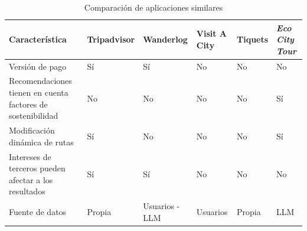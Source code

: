 \begin{table}[h]
	\centering
	\renewcommand{\arraystretch}{1.5} %
	\begin{tabular}{m{4.5cm} >{\centering\arraybackslash}m{2cm} >{\centering\arraybackslash}m{2cm} >{\centering\arraybackslash}m{2cm} >{\centering\arraybackslash}m{2cm} >{\centering\arraybackslash}m{2.5cm}} %
	\toprule
	\textbf{Característica} & \textbf{Tripadvisor} & \textbf{Wanderlog} & \textbf{Visit A City} & \textbf{Tiquets} & \textbf{\textit{Eco City Tour}} \\
	\midrule
	Versión de pago & Sí & Sí & No & No & No\\
	Recomendaciones tienen en cuenta factores de sostenibilidad & No & No & No & No & Sí\\
	Modificación dinámica de rutas & Sí & No & No & No & Sí\\
	Intereses de terceros pueden afectar a los resultados & Sí & Sí & No & No & No \\
	Fuente de datos & Propia & Usuarios - LLM & Usuarios & Propia & LLM\\
	\bottomrule
	\end{tabular}
	\caption{Comparación de aplicaciones similares} %
	\label{herramientasportipodeuso}
	\end{table}